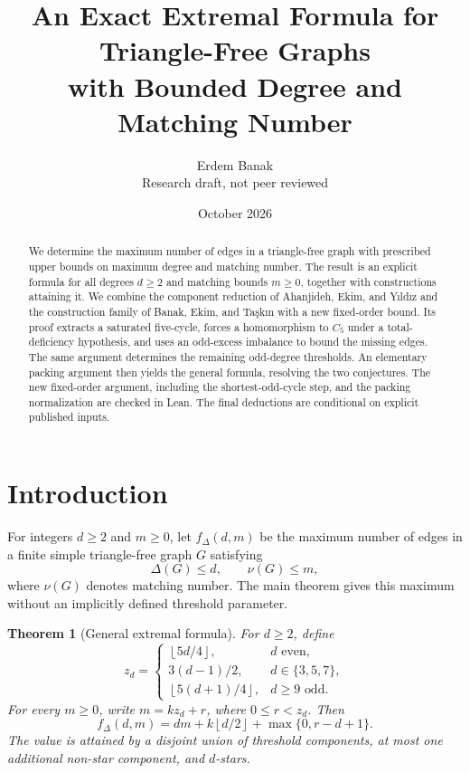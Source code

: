\documentclass[11pt]{article}
\title{An Exact Extremal Formula for Triangle-Free Graphs\\
with Bounded Degree and Matching Number}
\author{Erdem Banak\\[2mm]
\small Research draft, not peer reviewed}
\date{October 2026}
\newtheorem{theorem}{Theorem}[section]
\theoremstyle{definition}
\theoremstyle{remark}
\newcommand{\fDelta}{f_{\Delta}}
\newcommand{\floor}[1]{\left\lfloor #1\right\rfloor}
\begin{document}
\maketitle

\begin{abstract}
We determine the maximum number of edges in a triangle-free graph with
prescribed upper bounds on maximum degree and matching number. The result
is an explicit formula for all degrees $d\ge2$ and matching bounds $m\ge0$,
together with constructions attaining it. We combine the component reduction
of Ahanjideh, Ekim, and Y\i ld\i z and the construction family of Banak, Ekim,
and Ta\c{s}k\i n with a new fixed-order bound. Its proof extracts a saturated
five-cycle, forces a homomorphism to $C_5$ under a total-deficiency hypothesis,
and uses an odd-excess imbalance to bound the missing edges. The same argument
determines the remaining odd-degree thresholds. An elementary packing
argument then yields the general formula, resolving the two conjectures.
The new fixed-order argument, including the shortest-odd-cycle step, and the
packing normalization are checked in Lean. The final deductions are
conditional on explicit published inputs.
\end{abstract}

\section{Introduction}

For integers $d\ge2$ and $m\ge0$, let $\fDelta(d,m)$ be the maximum number of
edges in a finite simple triangle-free graph $G$ satisfying
\[
  \Delta(G)\le d,\qquad \nu(G)\le m,
\]
where $\nu(G)$ denotes matching number. The main theorem gives this maximum
without an implicitly defined threshold parameter.

\begin{theorem}[General extremal formula]\label{thm:main}
For $d\ge2$, define
\begin{equation}\label{eq:explicit-threshold}
  z_d=
  \begin{cases}
    \floor{5d/4},&d\text{ even},\\
    3(d-1)/2,&d\in\{3,5,7\},\\
    \floor{5(d+1)/4},&d\ge9\text{ odd}.
  \end{cases}
\end{equation}
For every $m\ge0$, write $m=kz_d+r$, where $0\le r<z_d$. Then
\begin{equation}\label{eq:main-formula}
  \fDelta(d,m)=dm+k\floor{d/2}+\max\{0,r-d+1\}.
\end{equation}
The value is attained by a disjoint union of threshold components, at most
one additional non-star component, and $d$-stars.
\end{theorem}
\end{document}
